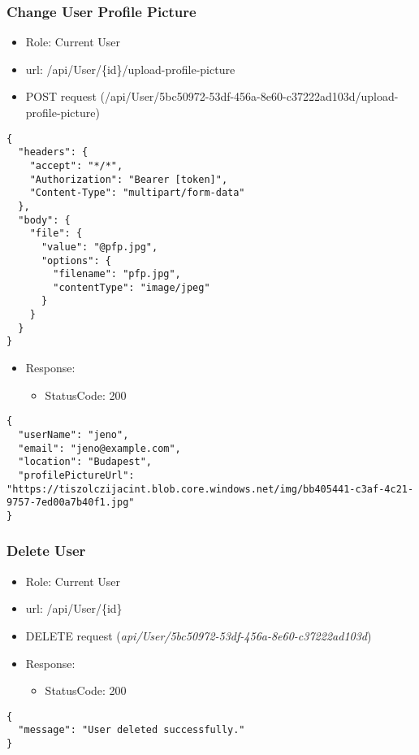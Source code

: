 \documentclass[11pt]{article}
\begin{document}
\subsubsection{Change User Profile Picture}
\label{sec:orgb783069}
\begin{itemize}
\item Role: Current User
\item url: /api/User/\{id\}/upload-profile-picture
\item POST request (/api/User/5bc50972-53df-456a-8e60-c37222ad103d/upload-profile-picture)
\end{itemize}
\begin{verbatim}
{
  "headers": {
    "accept": "*/*",
    "Authorization": "Bearer [token]",
    "Content-Type": "multipart/form-data"
  },
  "body": {
    "file": {
      "value": "@pfp.jpg",
      "options": {
        "filename": "pfp.jpg",
        "contentType": "image/jpeg"
      }
    }
  }
}
\end{verbatim}
\begin{itemize}
\item Response:
\begin{itemize}
\item StatusCode: 200
\end{itemize}
\end{itemize}
\begin{verbatim}
{
  "userName": "jeno",
  "email": "jeno@example.com",
  "location": "Budapest",
  "profilePictureUrl": "https://tiszolczijacint.blob.core.windows.net/img/bb405441-c3af-4c21-9757-7ed00a7b40f1.jpg"
}
\end{verbatim}
\subsubsection{Delete User}
\label{sec:orgecdcb5a}
\begin{itemize}
\item Role: Current User
\item url: /api/User/\{id\}
\item DELETE request (\emph{api/User/5bc50972-53df-456a-8e60-c37222ad103d})
\item Response:
\begin{itemize}
\item StatusCode: 200
\end{itemize}
\end{itemize}
\begin{verbatim}
{
  "message": "User deleted successfully."
}
\end{verbatim}
\end{document}
